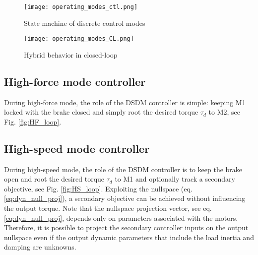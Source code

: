 \begin{figure}[H]
	\centering
		\texttt{[image: operating\_modes\_ctl.png]}
	\caption{State machine of discrete control modes}
	\label{fig:automaticflow}
\end{figure}

\begin{figure}[H]
	\centering
		\texttt{[image: operating\_modes\_CL.png]}
	\caption{Hybrid behavior in closed-loop}
	\label{fig:hybrid_closedloop}
\end{figure}


\subsection{High-force mode controller}

During high-force mode, the role of the DSDM controller is simple: keeping M1 locked with the brake closed and simply root the desired torque $\tau_d$ to M2, see Fig. \ref{fig:HF_loop}. 




\subsection{High-speed mode controller}


During high-speed mode, the role of the DSDM controller is to keep the brake open and root the desired torque $\tau_d$ to M1 and optionally track a secondary objective, see Fig. \ref{fig:HS_loop}. Exploiting the nullspace (eq. \eqref{eq:dyn_null_proj}), a secondary objective can be achieved without influencing the output torque. Note that the nullspace projection vector, see eq.\eqref{eq:dyn_null_proj}, depends only on parameters associated with the motors. Therefore, it is possible to project the secondary controller inputs on the output nullspace even if the output dynamic parameters that include the load inertia and damping are unknowns. 

